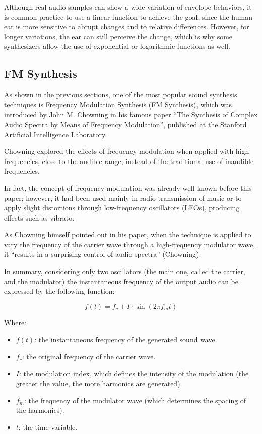 \documentclass[sigconf,natbib=false]{acmart}
\begin{document}
Although real audio samples can show a wide variation of envelope behaviors, it is common practice to use a linear function to achieve the goal, since the human ear is more sensitive to abrupt changes and to relative differences. However, for longer variations, the ear can still perceive the change, which is why some synthesizers allow the use of exponential or logarithmic functions as well.

\subsection{FM Synthesis}

As shown in the previous sections, one of the most popular sound synthesis techniques is Frequency Modulation Synthesis (FM Synthesis), which was introduced by John M. Chowning in his famous paper “The Synthesis of Complex Audio Spectra by Means of Frequency Modulation”, published at the Stanford Artificial Intelligence Laboratory.

Chowning explored the effects of frequency modulation when applied with high frequencies, close to the audible range, instead of the traditional use of inaudible frequencies.

In fact, the concept of frequency modulation was already well known before this paper; however, it had been used mainly in radio transmission of music or to apply slight distortions through low-frequency oscillators (LFOs), producing effects such as vibrato.

As Chowning himself pointed out in his paper, when the technique is applied to vary the frequency of the carrier wave through a high-frequency modulator wave, it “results in a surprising control of audio spectra” (Chowning).

In summary, considering only two oscillators (the main one, called the carrier, and the modulator) the instantaneous frequency of the output audio can be expressed by the following function:

\[
f(t) = f_c + I \cdot \sin(2\pi f_m t)
\]

Where:

\begin{itemize}
\item \( f(t) \): the instantaneous frequency of the generated sound wave.
\item \( f_c \): the original frequency of the carrier wave.
\item \( I \): the modulation index, which defines the intensity of the modulation (the greater the value, the more harmonics are generated).
\item \( f_m \): the frequency of the modulator wave (which determines the spacing of the harmonics).
\item \( t \): the time variable.
\end{itemize}
\end{document}
